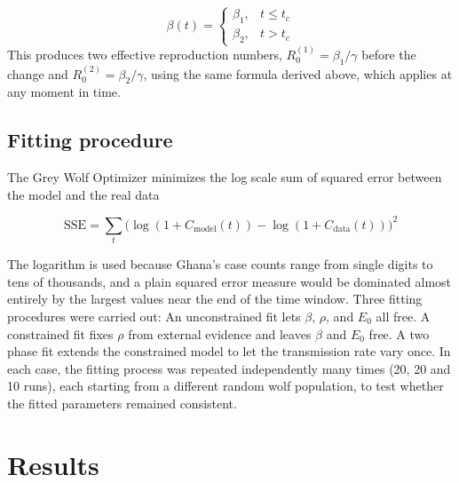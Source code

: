 \documentclass[journal]{IEEEtran}
\begin{document}
\begin{equation}
\beta(t) = \begin{cases} \beta_1, & t \leq t_c \\ \beta_2, & t > t_c \end{cases}
\end{equation}
This produces two effective reproduction numbers, $R_0^{(1)} = \beta_1/\gamma$ before the change and $R_0^{(2)} = \beta_2/\gamma$, using the same formula derived above, which applies at any moment in time.

\subsection{Fitting procedure}

The Grey Wolf Optimizer minimizes the log scale sum of squared error between the model and the real data

\begin{equation}
\text{SSE} = \sum_t \Big(\log(1{+}C_{\text{model}}(t)) - \log(1{+}C_{\text{data}}(t))\Big)^2
\end{equation}

The logarithm is used because Ghana's case counts range from single digits to tens of thousands, and a plain squared error measure would be dominated almost entirely by the largest values near the end of the time window. Three fitting procedures were carried out: An unconstrained fit lets $\beta$, $\rho$, and $E_0$ all free. A constrained fit fixes $\rho$ from external evidence and leaves $\beta$ and $E_0$ free. A two phase fit extends the constrained model to let the transmission rate vary once. In each case, the fitting process was repeated independently many times (20, 20 and 10 runs), each starting from a different random wolf population, to test whether the fitted parameters remained consistent.

\section{Results}
\end{document}
